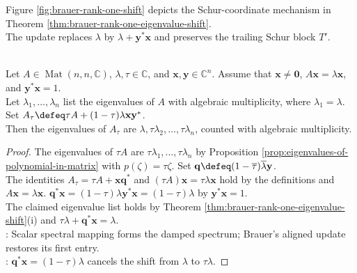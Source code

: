 Figure \ref{fig:brauer-rank-one-shift} depicts the Schur-coordinate mechanism in Theorem \ref{thm:brauer-rank-one-eigenvalue-shift}.\\
The update replaces $\lambda$ by $\lambda+\mathbf{y}^*\mathbf{x}$ and preserves the trailing Schur block $T'$.

\begin{illustrationfigure}[H]
  \centering
  
  \caption{Brauer's aligned update replaces the leading Schur entry and preserves the trailing block $T'$.}
  \label{fig:brauer-rank-one-shift}
\end{illustrationfigure}

\begin{corollary} \label{cor:damped-rank-one-eigenvalue-reset} \\
Let $A\in\operatorname{Mat}(n,n,\mathbb{C})$, $\lambda,\tau\in\mathbb{C}$, and $\mathbf{x},\mathbf{y}\in\mathbb{C}^n$. Assume that $\mathbf{x}\neq\mathbf{0}$, $A\mathbf{x}=\lambda\mathbf{x}$, and $\mathbf{y}^*\mathbf{x}=1$.\\
Let $\lambda_1,\ldots,\lambda_n$ list the eigenvalues of $A$ with algebraic multiplicity, where $\lambda_1=\lambda$. Set $A_{\tau}\defeq\tau A+(1-\tau)\lambda\mathbf{x}\mathbf{y}^*$.\\
Then the eigenvalues of $A_{\tau}$ are $\lambda,\tau\lambda_2,\ldots,\tau\lambda_n$, counted with algebraic multiplicity.
\begin{proof}
The eigenvalues of $\tau A$ are $\tau\lambda_1,\ldots,\tau\lambda_n$ by Proposition \ref{prop:eigenvalues-of-polynomial-in-matrix} with $p(\zeta)=\tau\zeta$. Set $\mathbf{q}\defeq(1-\overline{\tau})\overline{\lambda}\mathbf{y}$.\\
The identities $A_{\tau}=\tau A+\mathbf{x}\mathbf{q}^*$ and $(\tau A)\mathbf{x}=\tau\lambda\mathbf{x}$ hold by the definitions and $A\mathbf{x}=\lambda\mathbf{x}$. $\mathbf{q}^*\mathbf{x}=(1-\tau)\lambda\mathbf{y}^*\mathbf{x}=(1-\tau)\lambda$ by $\mathbf{y}^*\mathbf{x}=1$.\\
The claimed eigenvalue list holds by Theorem \ref{thm:brauer-rank-one-eigenvalue-shift}(i) and $\tau\lambda+\mathbf{q}^*\mathbf{x}=\lambda$.\\
: Scalar spectral mapping forms the damped spectrum; Brauer's aligned update restores its first entry.\\
: $\mathbf{q}^*\mathbf{x}=(1-\tau)\lambda$ cancels the shift from $\lambda$ to $\tau\lambda$.
\end{proof}
\end{corollary}
